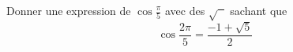 Donner une expression de $\cos \frac{\pi}{5}$ avec des $\sqrt{\phantom{x}}$ sachant que 
\begin{displaymath}
 \cos \frac{2\pi}{5} = \frac{-1 + \sqrt{5}}{2}
\end{displaymath}
\bigskip  \bigskip \bigskip
